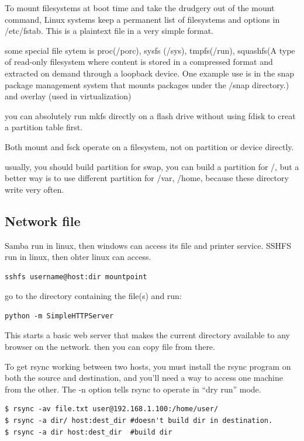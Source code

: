 \documentclass[paper=8.5in:11in, twoside, 12pt, pagesize=pdftex]{book}
\begin{document}
	\par To mount filesystems at boot time and take the drudgery out of the mount command, Linux systems keep a permanent list of filesystems and options in /etc/fstab. This is a plaintext file in a very simple format.
	
	\par some special file sytem is proc(/porc), sysfs (/sys), tmpfs(/run), squashfs(A type of read-only filesystem where content is stored in a compressed format and extracted on demand through a loopback device. One example use is in the snap package management system that mounts packages under the /snap directory.) and overlay (used in virtualization)
	
	\par you can absolutely run mkfs directly on a flash drive without using fdisk to creat a partition table first.
	
	\par Both mount and fsck operate on a filesystem, not on partition or device directly.
	
	\par usually, you should build partition for swap, you can build a partition for /, but a better way is to use different partition for /var, /home, because these directory write very often.  


 
\subsection{Network file}

	\par Samba run in linux, then windows can access its file and printer service. SSHFS run in linux, then ohter linux can access.
\begin{lstlisting}
sshfs username@host:dir mountpoint
\end{lstlisting}

	\par go to the directory containing the file(s) and run:
\begin{lstlisting}
python -m SimpleHTTPServer
\end{lstlisting}
		 This starts a basic web server that makes the current directory available to any browser on the network. then you can copy file from there. 		 
		 
	\par To get rsync working between two hosts, you must install the rsync program on both the source and destination, and you’ll need a way to access one machine from the other. The -n option tells rsync to operate in “dry run” mode.
\begin{lstlisting}
$ rsync -av file.txt user@192.168.1.100:/home/user/
$ rsync -a dir/ host:dest_dir #doesn't build dir in destination.
$ rsync -a dir host:dest_dir  #build dir
\end{lstlisting}
\end{document}
